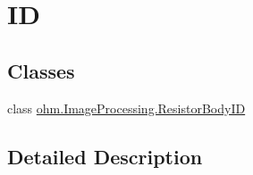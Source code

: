 \hypertarget{group___resistor}{}\section{ID}
\label{group___resistor}
\subsection*{Classes}
\begin{DoxyCompactItemize}
\item 
class \hyperlink{classohm_1_1_image_processing_1_1_resistor_body_i_d}{ohm.\+Image\+Processing.\+Resistor\+Body\+ID}
\end{DoxyCompactItemize}


\subsection{Detailed Description}
